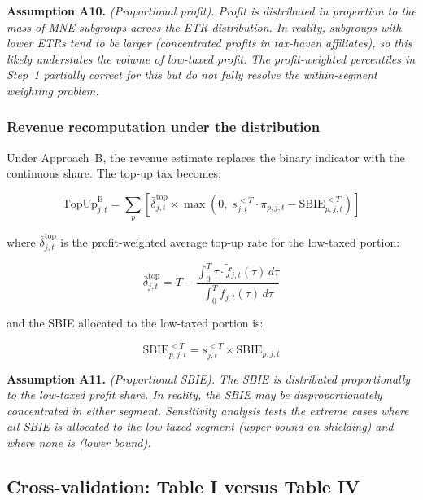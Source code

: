 \documentclass[11pt,a4paper]{article}
\newcommand{\assumption}[2]{\noindent\textbf{Assumption #1.} \textit{#2}\medskip}
\begin{document}
\assumption{A10}{(Proportional profit). Profit is distributed in proportion to the mass of MNE subgroups across the ETR distribution. In reality, subgroups with lower ETRs tend to be larger (concentrated profits in tax-haven affiliates), so this likely \emph{understates} the volume of low-taxed profit. The profit-weighted percentiles in Step~1 partially correct for this but do not fully resolve the within-segment weighting problem.}

\subsubsection{Revenue recomputation under the distribution}

Under Approach~B, the revenue estimate replaces the binary indicator with the continuous share. The top-up tax becomes:

\begin{equation}\label{eq:topup_distrib}
\text{TopUp}_{j,t}^{\text{B}} = \sum_p \left[\bar{\delta}_{j,t}^{\text{top}} \times \max\!\left(0,\; s_{j,t}^{<T} \cdot \pi_{p,j,t} - \text{SBIE}_{p,j,t}^{<T}\right)\right]
\end{equation}

where $\bar{\delta}_{j,t}^{\text{top}}$ is the profit-weighted average top-up rate for the low-taxed portion:

\begin{equation}\label{eq:avg_topup_rate}
\bar{\delta}_{j,t}^{\text{top}} = T - \frac{\int_0^{T} \tau \cdot \tilde{f}_{j,t}(\tau) \, d\tau}{\int_0^{T} \tilde{f}_{j,t}(\tau) \, d\tau}
\end{equation}

and the SBIE allocated to the low-taxed portion is:

\begin{equation}\label{eq:sbie_lowtax}
\text{SBIE}_{p,j,t}^{<T} = s_{j,t}^{<T} \times \text{SBIE}_{p,j,t}
\end{equation}

\assumption{A11}{(Proportional SBIE). The SBIE is distributed proportionally to the low-taxed profit share. In reality, the SBIE may be disproportionately concentrated in either segment. Sensitivity analysis tests the extreme cases where all SBIE is allocated to the low-taxed segment (upper bound on shielding) and where none is (lower bound).}

\subsection{Cross-validation: Table I versus Table IV}\label{sec:crossval}
\end{document}
